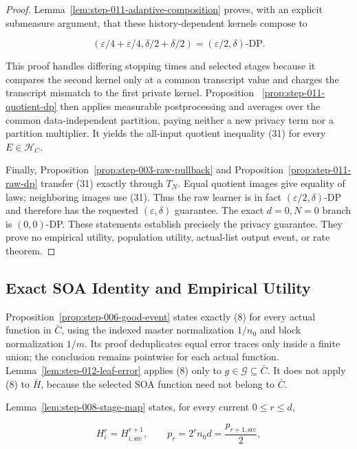 \begin{proof}
Lemma~\ref{lem:step-011-adaptive-composition} proves, with an explicit
submeasure argument, that these history-dependent kernels compose to

\[
 (\varepsilon/4+\varepsilon/4,
   \delta/2+\delta/2)
 =(\varepsilon/2,\delta)\text{-DP}.
\]

This proof handles differing stopping times and selected stages because it
compares the second kernel only at a common transcript value and charges
the transcript mismatch to the first private kernel. Proposition
~\ref{prop:step-011-quotient-dp} then applies measurable postprocessing and
averages over the common data-independent partition, paying neither a new
privacy term nor a partition multiplier. It yields the all-input quotient
inequality (31) for every \(E\in\mathcal H_C\).

Finally, Proposition~\ref{prop:step-003-raw-pullback} and
Proposition~\ref{prop:step-011-raw-dp} transfer (31) exactly through \(T_N\).
Equal quotient images give equality of laws; neighboring images use (31).
Thus the raw learner is in fact \((\varepsilon/2,\delta)\)-DP and therefore
has the requested \((\varepsilon,\delta)\) guarantee. The exact
\(d=0,N=0\) branch is \((0,0)\)-DP. These statements establish precisely the
 privacy guarantee. They prove no empirical utility, population
utility, actual-list output event, or rate theorem.



\end{proof}

\subsection{Exact SOA Identity and Empirical Utility}\label{app:step_012}


Proposition~\ref{prop:step-006-good-event} states exactly (8) for
every actual function in \(\bar C\), using the indexed master normalization
\(1/n_0\) and block normalization \(1/m\). Its proof deduplicates equal
error traces only inside a finite union; the conclusion remains pointwise
for each actual function. Lemma~\ref{lem:step-012-leaf-error} applies (8)
only to \(g\in\mathcal G\subseteq\bar C\). It does not apply (8) to
\(\bar H\), because the selected SOA function need not belong to
\(\bar C\).

Lemma~\ref{lem:step-008-stage-map} states, for every current
\(0\le r\le d\),

\[
 H_i^r=H_{i,\mathrm{src}}^{r+1},
 \qquad
 p_r=2^rn_0d=\frac{p_{r+1,\mathrm{src}}}{2},
\tag{12}
\]

